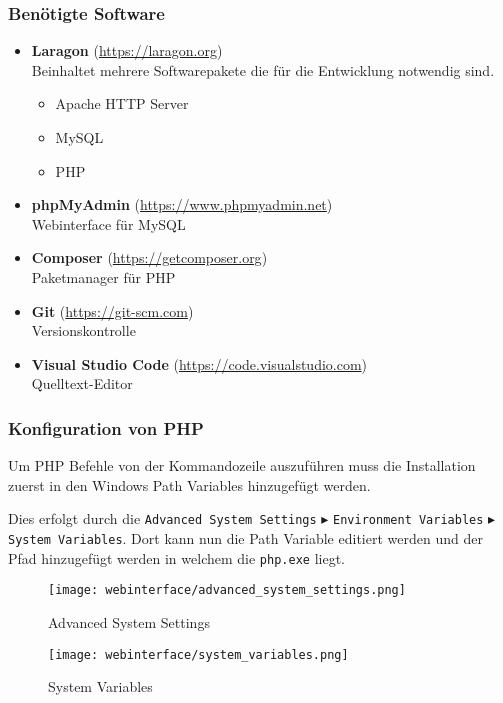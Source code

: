 \subsubsection{Benötigte Software}

\begin{itemize}
  \item \textbf{Laragon} (\url{https://laragon.org}) \\Beinhaltet mehrere
        Softwarepakete die für die Entwicklung notwendig sind.
        \begin{itemize}
          \item Apache HTTP Server
          \item MySQL
          \item PHP
        \end{itemize}
  \item \textbf{phpMyAdmin} (\url{https://www.phpmyadmin.net}) \\ Webinterface
        für MySQL
  \item \textbf{Composer} (\url{https://getcomposer.org}) \\ Paketmanager für
        PHP
  \item \textbf{Git} (\url{https://git-scm.com}) \\ Versionskontrolle
  \item \textbf{Visual Studio Code} (\url{https://code.visualstudio.com}) \\
        Quelltext-Editor
\end{itemize}


\subsubsection{Konfiguration von PHP}
Um PHP Befehle von der Kommandozeile auszuführen muss die Installation zuerst in
den Windows Path Variables hinzugefügt werden.

Dies erfolgt durch die \verb|Advanced System Settings| $\blacktriangleright$
\verb|Environment Variables| $\blacktriangleright$ \verb|System Variables|.
Dort kann nun die Path Variable editiert werden und der Pfad hinzugefügt werden
in welchem die \verb|php.exe| liegt.

\begin{figure}[H]
  \centering
  \texttt{[image: webinterface/advanced\_system\_settings.png]}
  \caption{Advanced System Settings}
\end{figure}

\begin{figure}[H]
  \centering
  \texttt{[image: webinterface/system\_variables.png]}
  \caption{System Variables}
\end{figure}

